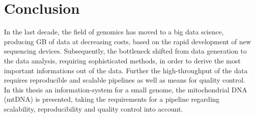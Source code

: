 \chapter{Conclusion}
\label{chap:conclusion}

In the last decade, the  field of genomics has moved to a big data science, producing GB of data at decreasing costs, based on the rapid development of new sequencing devices. Subsequently, the bottleneck shifted from data generation to the data analysis, requiring sophisticated methods, in order to derive the most important informations out of the data. Further the high-throughput of the data requires reproducible and scalable pipelines as well as means for quality control. In this thesis an information-system for a small genome, the mitochondrial DNA (mtDNA) is presented, taking the requirements for a pipeline regarding scalability, reproducibility and quality control into account. 

